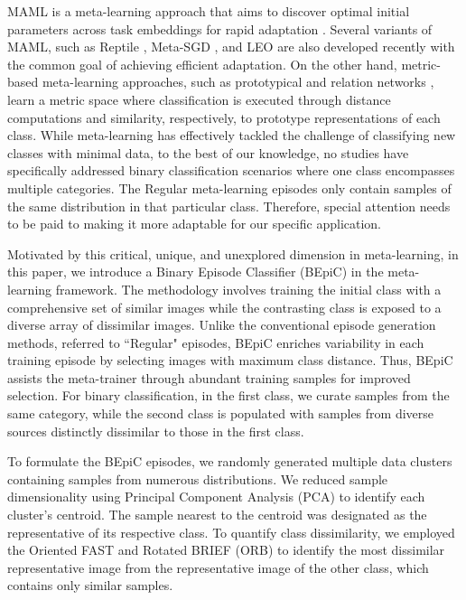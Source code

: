 MAML is a meta-learning approach that aims to discover optimal initial parameters across task embeddings for rapid adaptation \cite{finn2017model}. Several variants of MAML, such as Reptile \cite{nichol2018reptile}, Meta-SGD \cite{li2017meta}, and LEO \cite{rusu2018meta} are also developed recently with the common goal of achieving efficient adaptation. On the other hand, metric-based meta-learning approaches, such as prototypical \cite{snell2017prototypical} and relation networks \cite{sung2018learning}, learn a metric space where classification is executed through distance computations and similarity, respectively, to prototype representations of each class. While meta-learning has effectively tackled the challenge of classifying new classes with minimal data, to the best of our knowledge, no studies have specifically addressed binary classification scenarios where one class encompasses multiple categories. The Regular meta-learning episodes only contain samples of the same distribution in that particular class. Therefore, special attention needs to be paid to making it more adaptable for our specific application.

Motivated by this critical, unique, and unexplored dimension in meta-learning, in this paper, we introduce a Binary Episode Classifier (BEpiC) in the meta-learning framework. The methodology involves training the initial class with a comprehensive set of similar images while the contrasting class is exposed to a diverse array of dissimilar images. Unlike the conventional episode generation methods, referred to ``Regular" episodes, BEpiC enriches variability in each training episode by selecting images with maximum class distance. Thus, BEpiC assists the meta-trainer through abundant training samples for improved selection. For binary classification, in the first class, we curate samples from the same category, while the second class is populated with samples from diverse sources distinctly dissimilar to those in the first class. 

To formulate the BEpiC episodes, we randomly generated multiple data clusters containing samples from numerous distributions. We reduced sample dimensionality using Principal Component Analysis (PCA) \cite{chen2004subpattern} to identify each cluster's centroid. The sample nearest to the centroid was designated as the representative of its respective class. To quantify class dissimilarity, we employed the Oriented FAST and Rotated BRIEF (ORB) \cite{6126544} to identify the most dissimilar representative image from the representative image of the other class, which contains only similar samples.

